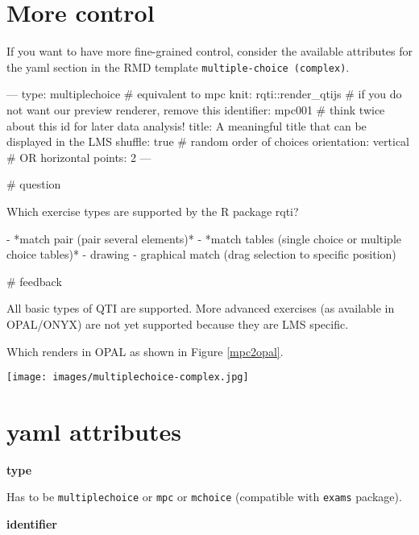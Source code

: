 \documentclass[twoside]{tufte-book}
\newenvironment{Shaded}{}{}
\begin{document}
\section{More control}\label{more-control-1}

If you want to have more fine-grained control, consider the available attributes for the yaml section in the RMD template \texttt{multiple-choice\ (complex)}.

\begin{Shaded}
\begin{Highlighting}
---
type: multiplechoice # equivalent to mpc
knit: rqti::render_qtijs # if you do not want our preview renderer, remove this
identifier: mpc001 # think twice about this id for later data analysis!
title: A meaningful title that can be displayed in the LMS
shuffle: true # random order of choices
orientation: vertical # OR horizontal
points: 2
---

# question

Which exercise types are supported by the R package rqti?

- *match pair (pair several elements)*
- *match tables (single choice or multiple choice tables)*
- drawing
- graphical match (drag selection to specific position)

# feedback

All basic types of QTI are supported. More advanced exercises (as available in
OPAL/ONYX) are not yet supported because they are LMS specific.
\end{Highlighting}
\end{Shaded}

Which renders in OPAL as shown in Figure \ref{mpc2opal}.

\begin{figure*}
\centering
\texttt{[image: images/multiplechoice-complex.jpg]}
\caption{\label{mpc2opal}More complex multiple choice task rendered in OPAL}
\end{figure*}

\section{yaml attributes}\label{yaml-attributes-1}

\noindent\textbf{type}\label{type-1}

Has to be \texttt{multiplechoice} or \texttt{mpc} or \texttt{mchoice} (compatible with \texttt{exams} package).

\noindent\textbf{identifier}\label{identifier-1}
\end{document}
